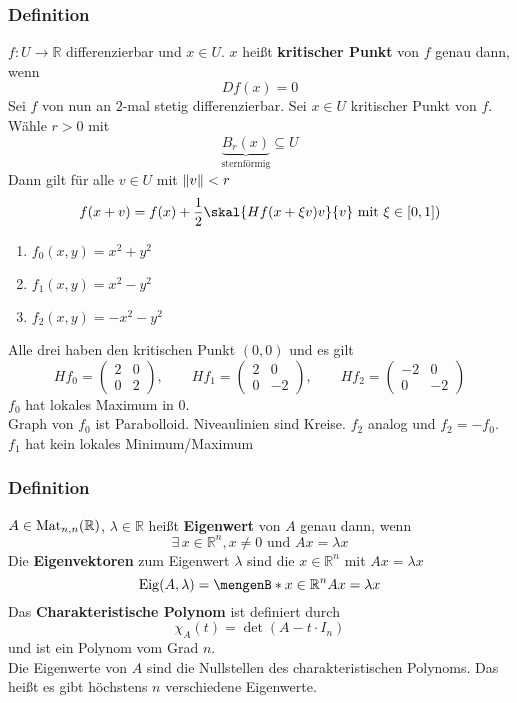 \subsubsection{Definition} %
\label{ssub:definition}
$ f: U \to \mathbb{R} $  differenzierbar und $x \in U$. $x$ heißt {\bfseries kritischer Punkt} von $f$ genau dann, wenn \[
	Df(x)=0
\] 
Sei $f$ von nun an $2$-mal stetig differenzierbar. Sei $x \in U$ kritischer Punkt von $f$. \\
Wähle $r > 0$ mit 
\[
	\underset{\text{sternförmig}}{\underbrace{B_r(x)}}\subseteq U
\]
Dann gilt für alle $v \in U$ mit $\norm{v}<r$
\[
	f(x+v)=f(x)+\frac{1}{2}\skal{Hf(x+\xi v)v}{v} \text{ mit }\xi \in [0,1])
\]
\begin{enumerate}
	\item $f_0(x,y)=x^2+y^2$
	\item $f_1(x,y)=x^2-y^2$
	\item $f_2(x,y)=-x^2-y^2$
\end{enumerate}
Alle drei haben den kritischen Punkt $(0,0)$ und es gilt
\[
	Hf_0= \begin{pmatrix}
		2 & 0 \\ 0 & 2 
	\end{pmatrix} ,\qquad Hf_1=\begin{pmatrix}
		2 & 0 \\ 0 & -2
	\end{pmatrix} ,\qquad Hf_2=\begin{pmatrix}
		-2 & 0 \\ 0 & -2
	\end{pmatrix}
\] $f_0$ hat lokales Maximum in $0$. \\
Graph von $f_0$ ist Parabolloid. Niveaulinien sind Kreise. $f_2$ analog und $f_2 = -f_0$. \\
$f_1$ hat kein lokales Minimum/Maximum
\subsubsection{Definition} %
\label{ssub:definition}
$A \in \operatorname{Mat}_{n,n}(\mathbb{R})$, $\lambda \in \mathbb{R}$ heißt {\bfseries Eigenwert} von $A$ genau dann, wenn
\[
	\exists\,x \in \mathbb{R}^n, x \neq 0 \text{ und } Ax=\lambda x
\]
Die {\bfseries Eigenvektoren} zum Eigenwert $\lambda$ sind die $x \in \mathbb{R}^n$ mit $Ax=\lambda x$
\[
	\Eig(A,\lambda)= \set[x \in \mathbb{R}^n]{Ax=\lambda x}
\]
Das {\bfseries Charakteristische Polynom} ist definiert durch
\[
	\chi_A(t)=\det(A-t \cdot I_n)
\]
und ist ein Polynom vom Grad $n$. \\
Die Eigenwerte von $A$ sind die Nullstellen des charakteristischen Polynoms. Das heißt es gibt höchstens $n$ verschiedene Eigenwerte.
